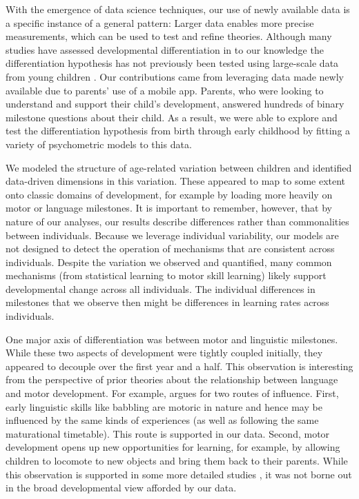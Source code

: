\documentclass[man, floatsintext]{apa7}
\begin{document}
With the emergence of data science techniques, our use of newly
available data is a specific instance of a general pattern: Larger data
enables more precise measurements, which can be used to test and refine theories.
Although many studies have assessed developmental differentiation in 
to our knowledge the differentiation hypothesis has not previously been tested using large-scale
data from young children \cite{breit2021}. 
Our contributions came from leveraging data made newly available
due to parents' use of a mobile app. Parents, who were looking to understand and
support their child's development, answered hundreds of binary milestone
questions about their child. As a result, we were able to explore and
test the differentiation hypothesis from birth through early childhood by fitting a
variety of psychometric models to this data.

We modeled the structure of age-related variation between children and identified data-driven dimensions in this variation. These appeared to map to some extent onto classic domains of development, for example by loading more heavily on motor or language milestones.
It is important to remember, however, that by nature of our analyses, our results describe differences rather than commonalities between individuals. Because we leverage individual variability, our models are not designed to detect the operation of mechanisms that are consistent across individuals. Despite the variation we observed and quantified,
many common mechanisms (from statistical learning to motor skill learning) likely support developmental change across all individuals. The individual differences in milestones that we observe then might be differences in learning rates across individuals.

One major axis of differentiation was between motor and linguistic milestones. While these two aspects of development were tightly coupled initially, they appeared to decouple over the first year and a half. This observation is interesting from the perspective of prior theories about the relationship between language and motor development. For example, \cite{iverson2010} argues for two routes of influence. First, early linguistic skills like babbling are motoric in nature and hence may be influenced by the same kinds of experiences (as well as following the same maturational timetable). This route is supported in our data. Second, motor development opens up new opportunities for learning, for example, by allowing children to locomote to new objects and bring them back to their parents. While this observation is supported in some more detailed studies \parencite[e.g.,][]{walle2014,karasik2014}, it was not borne out in the broad developmental view afforded by our data. 
\end{document}
